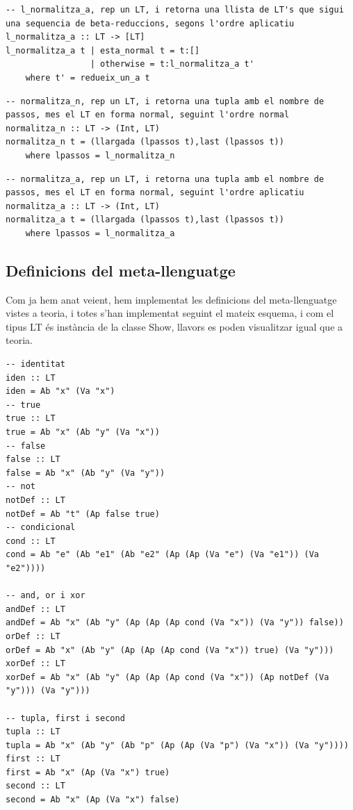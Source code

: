 \documentclass[10pt,a4paper]{article}
\begin{document}
\lstset{language=Haskell, breaklines=true, basicstyle=\footnotesize}
\begin{lstlisting}[frame=mystyle]
-- l_normalitza_a, rep un LT, i retorna una llista de LT's que sigui una sequencia de beta-reduccions, segons l'ordre aplicatiu
l_normalitza_a :: LT -> [LT]
l_normalitza_a t | esta_normal t = t:[]
                 | otherwise = t:l_normalitza_a t'
    where t' = redueix_un_a t
\end{lstlisting}



\lstset{language=Haskell, breaklines=true, basicstyle=\footnotesize}
\begin{lstlisting}[frame=mystyle]
-- normalitza_n, rep un LT, i retorna una tupla amb el nombre de passos, mes el LT en forma normal, seguint l'ordre normal
normalitza_n :: LT -> (Int, LT)
normalitza_n t = (llargada (lpassos t),last (lpassos t))
    where lpassos = l_normalitza_n
\end{lstlisting}

\lstset{language=Haskell, breaklines=true, basicstyle=\footnotesize}
\begin{lstlisting}[frame=mystyle]
-- normalitza_a, rep un LT, i retorna una tupla amb el nombre de passos, mes el LT en forma normal, seguint l'ordre aplicatiu
normalitza_a :: LT -> (Int, LT)
normalitza_a t = (llargada (lpassos t),last (lpassos t))
    where lpassos = l_normalitza_a
\end{lstlisting}

\clearpage

\subsection{Definicions del meta-llenguatge}

Com ja hem anat veient, hem implementat les definicions del meta-llenguatge vistes a teoria, i totes s'han implementat seguint el mateix esquema, i com el tipus LT és instància de la classe Show, llavors es poden visualitzar igual que a teoria.

\lstset{language=Haskell, breaklines=true, basicstyle=\footnotesize}
\begin{lstlisting}[frame=mystyle]
-- identitat
iden :: LT
iden = Ab "x" (Va "x")
-- true
true :: LT
true = Ab "x" (Ab "y" (Va "x"))
-- false
false :: LT
false = Ab "x" (Ab "y" (Va "y"))
-- not
notDef :: LT
notDef = Ab "t" (Ap false true)
-- condicional
cond :: LT
cond = Ab "e" (Ab "e1" (Ab "e2" (Ap (Ap (Va "e") (Va "e1")) (Va "e2"))))

-- and, or i xor
andDef :: LT
andDef = Ab "x" (Ab "y" (Ap (Ap (Ap cond (Va "x")) (Va "y")) false))
orDef :: LT
orDef = Ab "x" (Ab "y" (Ap (Ap (Ap cond (Va "x")) true) (Va "y")))
xorDef :: LT
xorDef = Ab "x" (Ab "y" (Ap (Ap (Ap cond (Va "x")) (Ap notDef (Va "y"))) (Va "y")))

-- tupla, first i second
tupla :: LT
tupla = Ab "x" (Ab "y" (Ab "p" (Ap (Ap (Va "p") (Va "x")) (Va "y"))))
first :: LT
first = Ab "x" (Ap (Va "x") true)
second :: LT
second = Ab "x" (Ap (Va "x") false)
\end{lstlisting}
\end{document}
